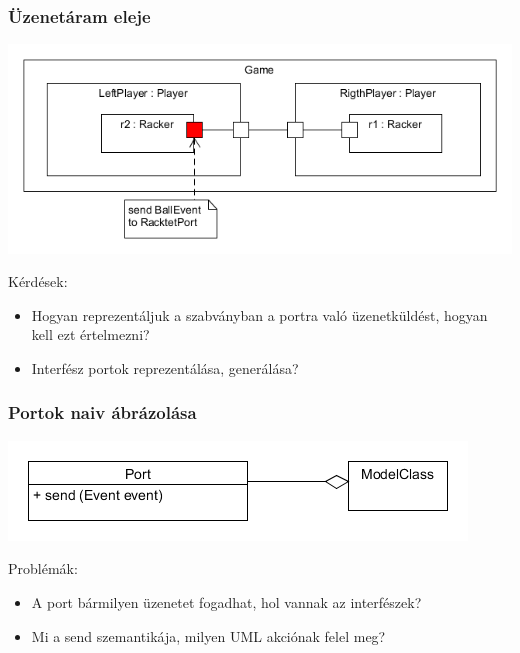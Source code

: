 \documentclass[11pt]{beamer}
\begin{document}
\begin{frame}
	\frametitle{Üzenetáram eleje}
	\includegraphics[scale=0.5]{vedes_demo_send.png}
	
	Kérdések:
	\begin{itemize}
	\item Hogyan reprezentáljuk a szabványban a portra való üzenetküldést, hogyan kell ezt értelmezni?
	\item Interfész portok reprezentálása, generálása?
	\end{itemize}
	
\end{frame}

\begin{frame}
	\frametitle{Portok naiv ábrázolása}
	\begin{center}
	\includegraphics[scale=0.5]{vedes_demo_simple_send.png}
	\end{center}
	Problémák: 
	\begin{itemize}
	\item A port bármilyen üzenetet fogadhat, hol vannak az interfészek?
	\item Mi a send szemantikája, milyen UML akciónak felel meg?
	\end{itemize}


\end{frame}
\end{document}
